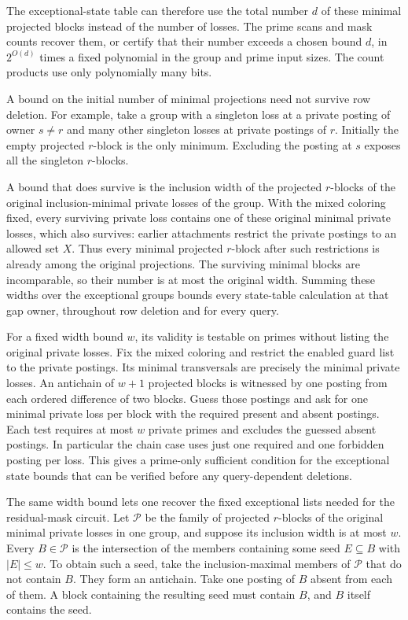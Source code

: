 The exceptional-state table can therefore use the
total number $d$ of these minimal projected blocks
instead of the number of losses. The prime scans and
mask counts recover them, or certify that their
number exceeds a chosen bound $d$, in $2^{O(d)}$
times a fixed polynomial in the group and prime
input sizes. The count products use only polynomially
many bits.

A bound on the initial number of minimal projections
need not survive row deletion. For example, take a
group with a singleton loss at a private posting of
owner $s\ne r$ and many other singleton losses at
private postings of $r$. Initially the empty projected
$r$-block is the only minimum. Excluding the posting
at $s$ exposes all the singleton $r$-blocks.

A bound that does survive is the inclusion width of
the projected $r$-blocks of the original
inclusion-minimal private losses of the group. With
the mixed coloring fixed, every surviving private
loss contains one of these original minimal private
losses, which also survives: earlier attachments
restrict the private postings to an allowed set $X$.
Thus every minimal projected $r$-block after such
restrictions is already among the original projections.
The surviving minimal blocks are incomparable, so
their number is at most the original width. Summing
these widths over the exceptional groups bounds every
state-table calculation at that gap owner, throughout
row deletion and for every query.

For a fixed width bound $w$, its validity is testable
on primes without listing the original private losses.
Fix the mixed coloring and restrict the enabled guard
list to the private postings. Its minimal transversals
are precisely the minimal private losses. An antichain
of $w+1$ projected blocks is witnessed by one posting
from each ordered difference of two blocks. Guess
those postings and ask for one minimal private loss
per block with the required present and absent
postings. Each test requires at most $w$ private
primes and excludes the guessed absent postings.
In particular the chain case uses just one required
and one forbidden posting per loss. This gives a
prime-only sufficient condition for the exceptional
state bounds that can be verified before any
query-dependent deletions.

The same width bound lets one recover the fixed
exceptional lists needed for the residual-mask
circuit. Let $\mathcal P$ be the family of projected
$r$-blocks of the original minimal private losses in
one group, and suppose its inclusion width is at most
$w$. Every $B\in\mathcal P$ is the intersection of
the members containing some seed $E\subseteq B$
with $|E|\le w$. To obtain such a seed, take the
inclusion-maximal members of $\mathcal P$ that do
not contain $B$. They form an antichain. Take one
posting of $B$ absent from each of them. A block
containing the resulting seed must contain $B$,
and $B$ itself contains the seed.

